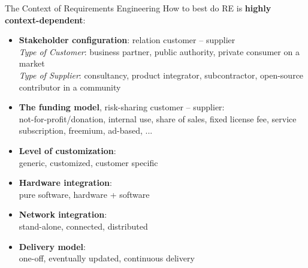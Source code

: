 \documentclass{simpleslides}
\begin{document}
\begin{frame}[fragile]{The Context of Requirements Engineering}
How to best do RE is \textbf{highly context-dependent}:
\begin{itemize} 
\item \textbf{Stakeholder configuration}: relation customer -- supplier
\\\textit{Type of Customer}: business partner, public authority, private consumer on a market
\\\textit{Type of Supplier}: consultancy, product integrator, subcontractor, open-source contributor in a community
\item \textbf{The funding model}, risk-sharing customer -- supplier:
\\not-for-profit/donation, internal use, share of sales, fixed license fee, service subscription, freemium, ad-based, ... 
\item \textbf{Level of customization}:
\\generic, customized, customer specific
\item \textbf{Hardware integration}:
\\pure software, hardware + software
\item \textbf{Network integration}:
\\stand-alone, connected, distributed
\item \textbf{Delivery model}:
\\one-off, eventually updated, continuous delivery
\end{itemize}
\end{frame}
\end{document}

